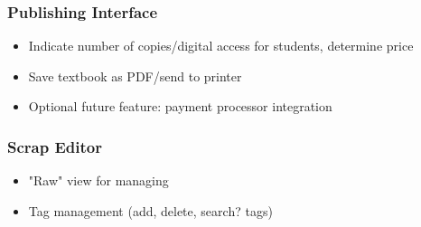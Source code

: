 \documentclass[letterpaper, 10pt, draftclsnofoot, compsoc, onecolumn]{IEEEtran}
\begin{document}
{{\subsubsection[System feature 5: Publishing Interface]{\rmfamily\bfseries\color{black} Publishing Interface}
\begin{itemize}
\item Indicate number of copies/digital access for students, determine price
\item Save textbook as PDF/send to printer
\item Optional future feature: payment processor integration
\end{itemize}

\subsubsection[System feature 6: Scrap Editor]{\rmfamily\bfseries\color{black} Scrap Editor}
\begin{itemize}
\item "Raw" view for managing
\item Tag management (add, delete, search? tags)
\end{itemize}

\bigskip


}}
\end{document}

